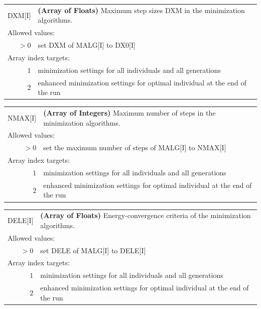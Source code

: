 \documentclass[10pt,a4paper,openany]{memoir}
\numberwithin{equation}{section}
\begin{document}
{
\begin{tabular}{r@{ : }l}
\label{descr:dxm}
  DXM[I]&\textbf{(Array of Floats)} Maximum step sizes DXM in the minimization algorithms.                                               \\ 
\multicolumn{2}{l}{Allowed values:} \\ 
  \(>0\)&set DXM of MALG[I] to DX0[I]                                                                         \\ 
\multicolumn{2}{l}{Array index targets:} \\ 
  \(1\)&minimization settings for all individuals and all generations \\
  \(2\)&enhanced minimization settings for optimal individual at the end of the run \\
\end{tabular}
\vspace{1ex}
}

{
\begin{tabular}{r@{ : }l}
\label{descr:nmax}
      NMAX[I]&\textbf{(Array of Integers)} Maximum number of steps in the minimization algorithms.                                              \\ 
\multicolumn{2}{l}{Allowed values:} \\ 
    \(>0\)&set the maximum number of steps of MALG[I] to NMAX[I]                                                \\ 
\multicolumn{2}{l}{Array index targets:} \\ 
  \(1\)&minimization settings for all individuals and all generations \\
  \(2\)&enhanced minimization settings for optimal individual at the end of the run \\
\end{tabular}
\vspace{1ex}
}

{
\begin{tabular}{r@{ : }l}
\label{descr:dele}
      DELE[I]&\textbf{(Array of Floats)} Energy-convergence criteria of the minimization algorithms.                                          \\ 
\multicolumn{2}{l}{Allowed values:} \\ 
    \(>0\)&set DELE of MALG[I] to DELE[I] \\ 
\multicolumn{2}{l}{Array index targets:} \\ 
  \(1\)&minimization settings for all individuals and all generations \\
  \(2\)&enhanced minimization settings for optimal individual at the end of the run \\
\end{tabular}
\vspace{1ex}
}
\end{document}
